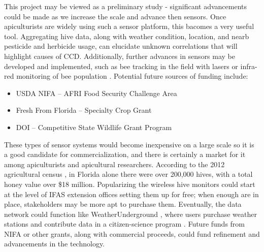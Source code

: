 
This project may be viewed as a preliminary study - significant advancements could be made as we increase the scale and advance then sensors. Once apiculturists are widely using such a sensor platform, this bacomes a very useful tool. Aggregating hive data, along with weather condition, location, and nearb pesticide and herbicide usage, can elucidate unknown correlations that will highlight causes of CCD. Additionally, further advances in sensors may be developed and implemented, such as bee tracking in the field with lasers \cite{carlsten2011field} or infra-red monitoring of bee population \cite{shaw2011long}. Potential future sources of funding include:

\begin{itemize}
\item USDA NIFA -- AFRI Food Security Challenge Area
\item Fresh From Florida -- Specialty Crop Grant
\item DOI -- Competitive State Wildlife Grant Program
\end{itemize}

These types of sensor systems would become inexpensive on a large scale so it is a good candidate for commercialization, and there is certainly a market for it among apiculturists and apicultural researchers. According to the 2012 agricultural census \cite{nass2012census}, in Florida alone there were over 200,000 hives, with a total honey value over \$18 million. Popularizing the wireless hive monitors could start at the level of IFAS extension offices setting them up for free; when enough are in place, stakeholders may be more apt to purchase them. Eventually, the data network could function like WeatherUnderground \cite{weather2016}, where users purchase weather stations and contribute data in a citizen-science program \cite{kremen2011evaluating}. Future funds from NIFA or other grants, along with commercial proceeds, could fund refinement and advancements in the technology.

